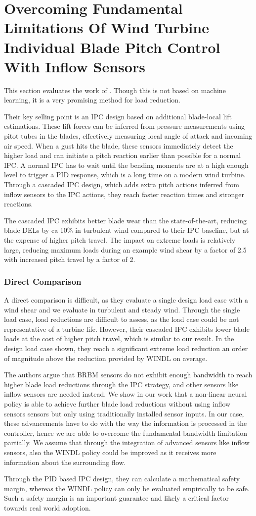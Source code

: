 \section{Overcoming Fundamental Limitations Of Wind Turbine Individual Blade Pitch Control With Inflow Sensors}
\label{section:related-jones}

This section evaluates the work of \citet{jonesOvercomingFundamentalLimitations2018}. Though this is not based on machine learning, it is a very promising method for load reduction.

Their key selling point is an \ac{IPC} design based on additional blade-local lift estimations. These lift forces can be inferred from pressure measurements using pitot tubes in the blades, effectively measuring local angle of attack and incoming air speed. When a gust hits the blade, these sensors immediately detect the higher load and can initiate a pitch reaction earlier than possible for a normal IPC. A normal IPC has to wait until the bending moments are at a high enough level to trigger a PID response, which is a long time on a modern wind turbine. Through a cascaded IPC design, which adds extra pitch actions inferred from inflow sensors to the IPC actions, they reach faster reaction times and stronger reactions.

The cascaded IPC exhibits better blade wear than the state-of-the-art, reducing blade DELs by ca 10\% in turbulent wind compared to their IPC baseline, but at the expense of higher pitch travel. The impact on extreme loads is relatively large, reducing maximum loads during an example wind shear by a factor of 2.5 with increased pitch travel by a factor of 2. 

\subsubsection{Direct Comparison}

A direct comparison is difficult, as they evaluate a single design load case with a wind shear and we evaluate in turbulent and steady wind. Through the single load case, load reductions are difficult to assess, as the load case could be not representative of a turbine life. However, their cascaded IPC exhibits lower blade loads at the cost of higher pitch travel, which is similar to our result. In the design load case shown, they reach a significant extreme load reduction an order of magnitude above the reduction provided by WINDL on average.

The authors argue that \ac{BRBM} sensors do not exhibit enough bandwidth to reach higher blade load reductions through the \ac{IPC} strategy, and other sensors like inflow sensors are needed instead. We show in our work that a non-linear neural policy is able to achieve further blade load reductions without using inflow sensors sensors but only using traditionally installed sensor inputs. In our case, these advancements have to do with the way the information is processed in the controller, hence we are able to overcome the fundamental bandwidth limitation partially. We assume that through the integration of advanced sensors like inflow sensors, also the WINDL policy could be improved as it receives more information about the surrounding flow.

Through the PID based IPC design, they can calculate a mathematical safety margin, whereas the WINDL policy can only be evaluated empirically to be safe. Such a safety margin is an important guarantee and likely a critical factor towards real world adoption.